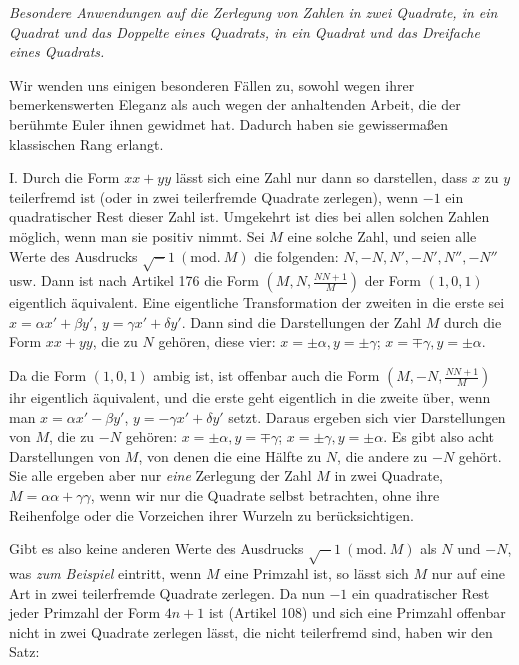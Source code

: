 \begin{center}
\textit{Besondere Anwendungen auf die Zerlegung von Zahlen in zwei Quadrate, in ein Quadrat und das Doppelte eines Quadrats, in ein Quadrat und das Dreifache eines Quadrats.}
\end{center}

Wir wenden uns einigen besonderen Fällen zu, sowohl wegen ihrer bemerkenswerten Eleganz als auch wegen der anhaltenden Arbeit, die der berühmte Euler ihnen gewidmet hat. Dadurch haben sie gewissermaßen klassischen Rang erlangt.

I. Durch die Form $xx+yy$ lässt sich eine Zahl nur dann so darstellen, dass $x$ zu $y$ teilerfremd ist (oder in
zwei teilerfremde Quadrate zerlegen), wenn $-1$ ein quadratischer Rest dieser Zahl ist. Umgekehrt ist dies bei allen solchen Zahlen möglich, wenn man sie positiv nimmt. Sei $M$ eine solche Zahl, und seien alle Werte des Ausdrucks $\surd-1\ (\mathrm{mod.}\ M)$ die folgenden: $N,-N,N',-N',N'',-N''$ usw. Dann ist nach Artikel 176 die Form $(M,N,\frac{NN+1}{M})$ der Form $(1,0,1)$ eigentlich äquivalent. Eine eigentliche Transformation der zweiten in die erste sei $x=\alpha x'+\beta y'$, $y=\gamma x'+\delta y'$. Dann sind die Darstellungen der Zahl $M$ durch die Form $xx+yy$, die zu $N$ gehören, diese vier: $x=\pm\alpha,y=\pm\gamma$; $x=\mp\gamma,y=\pm\alpha$.

Da die Form $(1,0,1)$ ambig ist, ist offenbar auch die Form $(M,-N,\frac{NN+1}{M})$ ihr eigentlich äquivalent, und die erste geht eigentlich in die zweite über, wenn man $x=\alpha x'-\beta y'$, $y=-\gamma x'+\delta y'$ setzt. Daraus ergeben sich vier Darstellungen von $M$, die zu $-N$ gehören: $x=\pm\alpha,y=\mp\gamma$; $x=\pm\gamma,y=\pm\alpha$. Es gibt also acht Darstellungen von $M$, von denen die eine Hälfte zu $N$, die andere zu $-N$ gehört. Sie alle ergeben aber nur \textit{eine} Zerlegung der Zahl $M$ in zwei Quadrate, $M=\alpha\alpha+\gamma\gamma$, wenn wir nur die Quadrate selbst betrachten, ohne ihre Reihenfolge oder die Vorzeichen ihrer Wurzeln zu berücksichtigen.

Gibt es also keine anderen Werte des Ausdrucks $\surd-1\ (\mathrm{mod.}\ M)$ als $N$ und $-N$, was \textit{zum Beispiel} eintritt, wenn $M$ eine Primzahl ist, so lässt sich $M$ nur auf eine Art in zwei teilerfremde Quadrate zerlegen. Da nun $-1$ ein quadratischer Rest jeder Primzahl der Form $4n+1$ ist (Artikel 108) und sich eine Primzahl offenbar nicht in zwei Quadrate zerlegen lässt, die nicht teilerfremd sind, haben wir den Satz:

